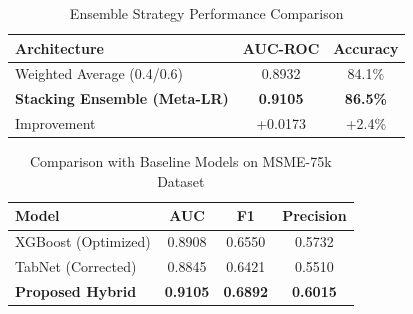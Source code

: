 \begin{table}[!t]
\renewcommand{\arraystretch}{1.3}
\caption{Ensemble Strategy Performance Comparison}
\label{table_ensemble}
\centering
\begin{tabular}{l|c|c}
\hline
Architecture & AUC-ROC & Accuracy \\
\hline
Weighted Average (0.4/0.6) & 0.8932 & 84.1\% \\
\textbf{Stacking Ensemble (Meta-LR)} & \textbf{0.9105} & \textbf{86.5\%} \\
\hline
Improvement & +0.0173 & +2.4\% \\
\hline
\end{tabular}
\end{table}

\begin{table}[!t]
\renewcommand{\arraystretch}{1.3}
\caption{Comparison with Baseline Models on MSME-75k Dataset}
\label{table_comparison}
\centering
\begin{tabular}{l|c|c|c}
\hline
Model & AUC & F1 & Precision \\
\hline
XGBoost (Optimized) & 0.8908 & 0.6550 & 0.5732 \\
TabNet (Corrected) & 0.8845 & 0.6421 & 0.5510 \\
\textbf{Proposed Hybrid} & \textbf{0.9105} & \textbf{0.6892} & \textbf{0.6015} \\
\hline
\end{tabular}
\end{table}
